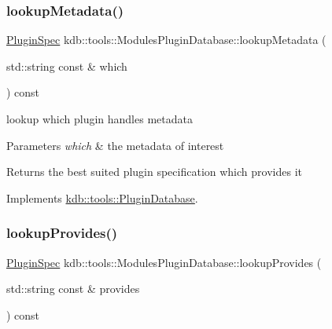 \subsubsection{\texorpdfstring{lookup\+Metadata()}{lookupMetadata()}}
{\footnotesize\ttfamily \hyperlink{classkdb_1_1tools_1_1PluginSpec}{Plugin\+Spec} kdb\+::tools\+::\+Modules\+Plugin\+Database\+::lookup\+Metadata (\begin{DoxyParamCaption}\item[{std\+::string const \&}]{which }\end{DoxyParamCaption}) const\hspace{0.3cm}{\ttfamily [virtual]}}



lookup which plugin handles metadata 


\begin{DoxyParams}{Parameters}
{\em which} & the metadata of interest\\
\hline
\end{DoxyParams}
\begin{DoxyReturn}{Returns}
the best suited plugin specification which provides it 
\end{DoxyReturn}


Implements \hyperlink{classkdb_1_1tools_1_1PluginDatabase_a03a416f66d6525f46929e5a68d9db3f7}{kdb\+::tools\+::\+Plugin\+Database}.

\mbox{\label{classkdb_1_1tools_1_1ModulesPluginDatabase_acdb15c10fc34f74687ecbbf8bac526f6}} 
\subsubsection{\texorpdfstring{lookup\+Provides()}{lookupProvides()}}
{\footnotesize\ttfamily \hyperlink{classkdb_1_1tools_1_1PluginSpec}{Plugin\+Spec} kdb\+::tools\+::\+Modules\+Plugin\+Database\+::lookup\+Provides (\begin{DoxyParamCaption}\item[{std\+::string const \&}]{provides }\end{DoxyParamCaption}) const\hspace{0.3cm}{\ttfamily [virtual]}}



